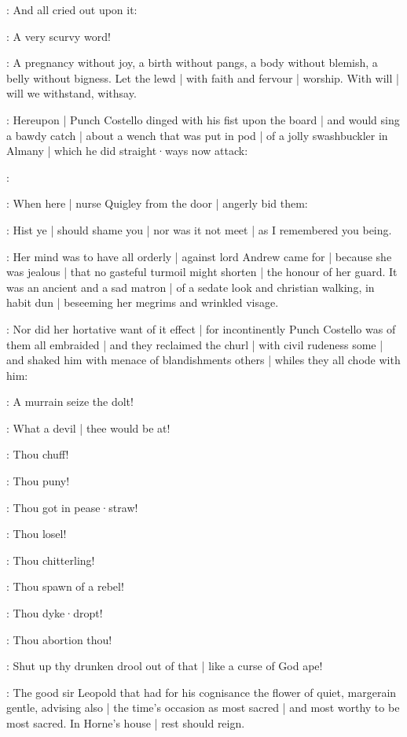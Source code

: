 :
And all cried out upon it:

\All:
A very scurvy word!

\stephen:
A pregnancy without joy,
a birth without pangs,
a body without blemish,
a belly without bigness.
Let the lewd |
with faith and fervour |
worship.
With will |
will we withstand,
withsay.


:
Hereupon |
Punch Costello dinged with his fist upon the board |
and would sing a bawdy catch  |
about a wench that was put in pod |
of a jolly swashbuckler in Almany |
which he did straight·ways now attack:

\punch:

:
When here |
nurse Quigley from the door |
angerly bid them:

\nursequigley:
Hist ye |
should shame you |
nor was it not meet |
as I remembered you being.

:
Her mind was to have all orderly |
against lord Andrew came for |
because she was jealous |
that no gasteful turmoil might shorten |
the honour of her guard.
It was an ancient and a sad matron |
of a sedate look and christian walking,
in habit dun |
beseeming her megrims and wrinkled visage.

:
Nor did her hortative want of it effect |
for incontinently Punch Costello was of them all embraided |
and they reclaimed the churl |
with civil rudeness some |
and shaked him with menace of blandishments others |
whiles they all chode with him:

\lynch:
A murrain seize the dolt!

\madden:
What a devil |
thee would be at!

\crotthers:
Thou chuff!

\dixon:
Thou puny!

\lenehan:
Thou got in pease·straw!

\lynch:
Thou losel!

\madden:
Thou chitterling!

\crotthers:
Thou spawn of a rebel!

\lenehan:
Thou dyke·dropt!

\dixon:
Thou abortion thou!

\stephen:
Shut up thy drunken drool out of that |
like a curse of God ape!

:
The good sir Leopold
that had for his cognisance
the flower of quiet,
margerain gentle,
advising also |
the time's occasion as most sacred |
and most worthy to be most sacred.
In Horne's house |
rest should reign.

